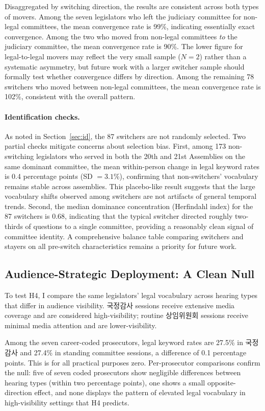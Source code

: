 \documentclass[11pt]{article}
\begin{document}
Disaggregated by switching direction, the results are consistent across both types of movers. Among the seven legislators who left the judiciary committee for non-legal committees, the mean convergence rate is 99\%, indicating essentially exact convergence. Among the two who moved from non-legal committees \textit{to} the judiciary committee, the mean convergence rate is 90\%. The lower figure for legal-to-legal movers may reflect the very small sample ($N = 2$) rather than a systematic asymmetry, but future work with a larger switcher sample should formally test whether convergence differs by direction. Among the remaining 78 switchers who moved between non-legal committees, the mean convergence rate is 102\%, consistent with the overall pattern.

\paragraph{Identification checks.} As noted in Section~\ref{sec:id}, the 87 switchers are not randomly selected. Two partial checks mitigate concerns about selection bias. First, among 173 non-switching legislators who served in both the 20th and 21st Assemblies on the same dominant committee, the mean within-person change in legal keyword rates is 0.4 percentage points (SD $= 3.1$\%), confirming that non-switchers' vocabulary remains stable across assemblies. This placebo-like result suggests that the large vocabulary shifts observed among switchers are not artifacts of general temporal trends. Second, the median dominance concentration (Herfindahl index) for the 87 switchers is 0.68, indicating that the typical switcher directed roughly two-thirds of questions to a single committee, providing a reasonably clean signal of committee identity. A comprehensive balance table comparing switchers and stayers on all pre-switch characteristics remains a priority for future work.

\subsection{Audience-Strategic Deployment: A Clean Null}

To test H4, I compare the same legislators' legal vocabulary across hearing types that differ in audience visibility. 국정감사 sessions receive extensive media coverage and are considered high-visibility; routine 상임위원회 sessions receive minimal media attention and are lower-visibility.

Among the seven career-coded prosecutors, legal keyword rates are 27.5\% in 국정감사 and 27.4\% in standing committee sessions, a difference of 0.1 percentage points. This is for all practical purposes zero. Per-prosecutor comparisons confirm the null: five of seven coded prosecutors show negligible differences between hearing types (within two percentage points), one shows a small opposite-direction effect, and none displays the pattern of elevated legal vocabulary in high-visibility settings that H4 predicts.
\end{document}
